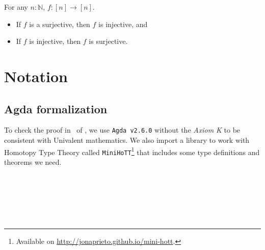 \documentclass[11pt, a4paper, oneside]{amsart}
\begin{document}
For any $n : ℕ$, $f : [n] \to [n]$.
\begin{itemize}
\item If $f$ is a surjective, then $f$ is injective, and
\item If $f$ is injective, then $f$ is surjective.
\end{itemize}

\section{Notation}

\subsection{Agda formalization}

To check the proof in~ of , we
use \texttt{Agda v2.6.0} without the \emph{Axiom K} to be consistent with
Univalent mathematics. We also import a library to work with Homotopy Type
Theory called \texttt{MiniHoTT}\footnote{Available on
\url{http://jonaprieto.github.io/mini-hott}.} that includes some type
definitions and theorems we need.

\begin{code}%
\>[0]\AgdaSymbol{\{-\#}\AgdaSpace{}%
\AgdaSpace{}%
%
\>[25]\AgdaSymbol{\#-\}}\<%
\\
\>[0]\AgdaSpace{}%
\AgdaSpace{}%
\<%
\end{code}

\begin{code}[hide]%
\>[0][@{}l@{\AgdaIndent{1}}]%
\>[2]\AgdaSpace{}%
\AgdaSymbol{(}\AgdaSymbol{)}\<%
\\
\>[0]\AgdaSpace{}%
\AgdaModule{\AgdaUnderscore{}}\AgdaSpace{}%
\AgdaSymbol{\{}\AgdaSpace{}%
\AgdaSymbol{:}\AgdaSpace{}%
\AgdaSymbol{\}}\AgdaSpace{}%
\<%
\\
\>[0][@{}l@{\AgdaIndent{0}}]%
\>[2]\AgdaSpace{}%
\AgdaSpace{}%
\<%
\\
%
\>[2]\AgdaSpace{}%
\AgdaSymbol{=}\AgdaSpace{}%
\AgdaSpace{}%
\AgdaSymbol{\{}\AgdaSymbol{\}}\<%
\end{code}
\end{document}
